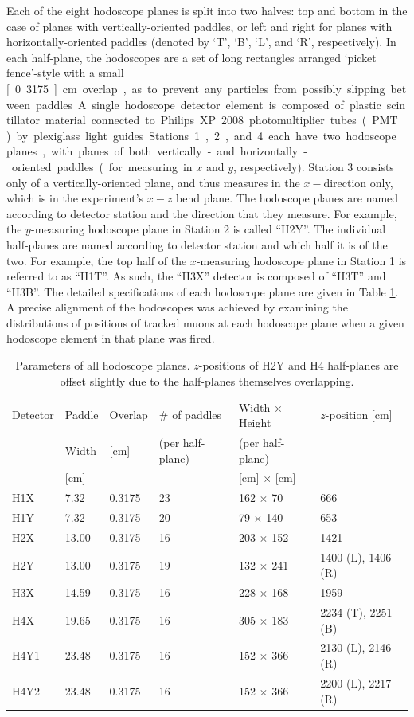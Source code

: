 Each of the eight hodoscope planes is split into two halves: top and bottom in the case of planes with vertically-oriented paddles, or left and right for planes with horizontally-oriented paddles (denoted by `T', `B', `L', and `R', respectively). In each half-plane, the hodoscopes are a set of long rectangles arranged `picket fence'-style with a small \unit[0.3175]{cm} overlap, as to prevent any particles from possibly slipping between paddles. A single hodoscope detector element is composed of plastic scintillator material connected to Philips XP 2008 photomultiplier tubes (PMT) by plexiglass light guides. Stations 1, 2, and 4 each have two hodoscope planes, with planes of both vertically- and horizontally-oriented paddles (for measuring in $x$ and $y$, respectively). Station 3 consists only of a vertically-oriented plane, and thus measures in the $x-$direction only, which is in the experiment's $x-z$ bend plane. The hodoscope planes are named according to detector station and the direction that they measure. For example, the $y$-measuring hodoscope plane in Station 2 is called ``H2Y''. The individual half-planes are named according to detector station and which half it is of the two. For example, the top half of the $x$-measuring hodoscope plane in Station 1 is referred to as ``H1T''. As such, the ``H3X'' detector is composed of ``H3T'' and ``H3B''. The detailed specifications of each hodoscope plane are given in Table \ref{tab:hodoscopes}. A precise alignment of the hodoscopes was achieved by examining the distributions of positions of tracked muons at each hodoscope plane when a given hodoscope element in that plane was fired.

\begin{table}[bthp]\centering
	\begin{tabular}{llllll}
		\hline
		\hline
		Detector & Paddle & Overlap & \# of paddles & Width $\times$ Height & $z$-position [cm] \\
		& Width & [cm] & (per half-plane) & (per half-plane) &  \\
		& [cm] & & & [cm] $\times$ [cm] & \\
		\hline
		H1X & 7.32 & 0.3175 & 23 & 162 $\times$ 70 & 666 \\
		H1Y & 7.32 & 0.3175 & 20 & 79 $\times$ 140 & 653 \\
		H2X & 13.00 & 0.3175 & 16 & 203 $\times$ 152 & 1421 \\
		H2Y & 13.00 & 0.3175 & 19  & 132 $\times$ 241 & 1400 (L), 1406 (R) \\
		H3X & 14.59 & 0.3175 & 16  & 228 $\times$ 168 & 1959 \\
		H4X & 19.65 & 0.3175 & 16  &  305 $\times$ 183 & 2234 (T), 2251 (B) \\
		H4Y1 & 23.48 & 0.3175 & 16  & 152 $\times$ 366 & 2130 (L), 2146 (R) \\
		H4Y2 & 23.48 & 0.3175 & 16  & 152 $\times$ 366 & 2200 (L), 2217 (R)\\
		\hline
		\hline
	\end{tabular}
	\caption{Parameters of all hodoscope planes. $z$-positions of H2Y and H4 half-planes are offset slightly due to the half-planes themselves overlapping.}
	\label{tab:hodoscopes}
\end{table}


